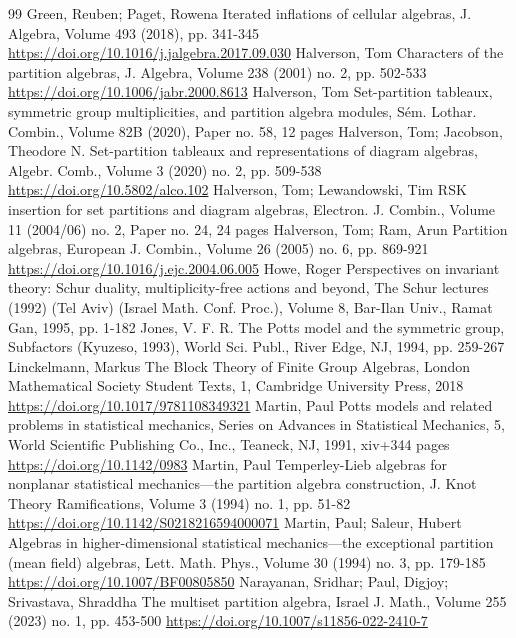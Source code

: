 \documentclass[10pt]{amsart}
\theoremstyle{definition}
\theoremstyle{definition}
\theoremstyle{plain}
\theoremstyle{remark}
\theoremstyle{plain}
\theoremstyle{plain}
\begin{document}
\begin{thebibliography}{99}
 Green, Reuben; Paget, Rowena Iterated inflations of cellular algebras, J. Algebra, Volume 493 (2018), pp. 341-345 \url{https://doi.org/10.1016/j.jalgebra.2017.09.030}
 Halverson, Tom Characters of the partition algebras, J. Algebra, Volume 238 (2001) no. 2, pp. 502-533 \url{https://doi.org/10.1006/jabr.2000.8613}
 Halverson, Tom Set-partition tableaux, symmetric group multiplicities, and partition algebra modules, Sém. Lothar. Combin., Volume 82B (2020), Paper no. 58, 12 pages
 Halverson, Tom; Jacobson, Theodore N. Set-partition tableaux and representations of diagram algebras, Algebr. Comb., Volume 3 (2020) no. 2, pp. 509-538 \url{https://doi.org/10.5802/alco.102}
 Halverson, Tom; Lewandowski, Tim RSK insertion for set partitions and diagram algebras, Electron. J. Combin., Volume 11 (2004/06) no. 2, Paper no. 24, 24 pages
 Halverson, Tom; Ram, Arun Partition algebras, European J. Combin., Volume 26 (2005) no. 6, pp. 869-921 \url{https://doi.org/10.1016/j.ejc.2004.06.005}
 Howe, Roger Perspectives on invariant theory: Schur duality, multiplicity-free actions and beyond, The Schur lectures (1992) (Tel Aviv) (Israel Math. Conf. Proc.), Volume 8, Bar-Ilan Univ., Ramat Gan, 1995, pp. 1-182
 Jones, V. F. R. The Potts model and the symmetric group, Subfactors (Kyuzeso, 1993), World Sci. Publ., River Edge, NJ, 1994, pp. 259-267
 Linckelmann, Markus The Block Theory of Finite Group Algebras, London Mathematical Society Student Texts, 1, Cambridge University Press, 2018 \url{https://doi.org/10.1017/9781108349321}
 Martin, Paul Potts models and related problems in statistical mechanics, Series on Advances in Statistical Mechanics, 5, World Scientific Publishing Co., Inc., Teaneck, NJ, 1991, xiv+344 pages \url{https://doi.org/10.1142/0983}
 Martin, Paul Temperley-Lieb algebras for nonplanar statistical mechanics—the partition algebra construction, J. Knot Theory Ramifications, Volume 3 (1994) no. 1, pp. 51-82 \url{https://doi.org/10.1142/S0218216594000071}
 Martin, Paul; Saleur, Hubert Algebras in higher-dimensional statistical mechanics—the exceptional partition (mean field) algebras, Lett. Math. Phys., Volume 30 (1994) no. 3, pp. 179-185 \url{https://doi.org/10.1007/BF00805850}
 Narayanan, Sridhar; Paul, Digjoy; Srivastava, Shraddha The multiset partition algebra, Israel J. Math., Volume 255 (2023) no. 1, pp. 453-500 \url{https://doi.org/10.1007/s11856-022-2410-7}

\end{thebibliography}
\end{document}
